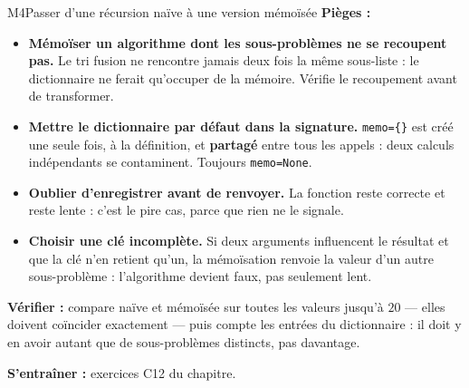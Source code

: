 \begin{fichemethode}{M4}{Passer d'une récursion naïve à une version mémoïsée}
\textbf{Pièges :}
\begin{itemize}
  \item \textbf{Mémoïser un algorithme dont les sous-problèmes ne se recoupent pas.} Le tri
    fusion ne rencontre jamais deux fois la même sous-liste : le dictionnaire ne ferait
    qu'occuper de la mémoire. Vérifie le recoupement avant de transformer.
  \item \textbf{Mettre le dictionnaire par défaut dans la signature.} \lstinline!memo={}! est
    créé une seule fois, à la définition, et \textbf{partagé} entre tous les appels : deux
    calculs indépendants se contaminent. Toujours \lstinline{memo=None}.
  \item \textbf{Oublier d'enregistrer avant de renvoyer.} La fonction reste correcte et reste
    lente : c'est le pire cas, parce que rien ne le signale.
  \item \textbf{Choisir une clé incomplète.} Si deux arguments influencent le résultat et que
    la clé n'en retient qu'un, la mémoïsation renvoie la valeur d'un autre sous-problème :
    l'algorithme devient faux, pas seulement lent.
\end{itemize}

\textbf{Vérifier :} compare naïve et mémoïsée sur toutes les valeurs jusqu'à $20$ — elles
doivent coïncider exactement — puis compte les entrées du dictionnaire : il doit y en avoir
autant que de sous-problèmes distincts, pas davantage.

\textbf{S'entraîner :} exercices C12 du chapitre.
\end{fichemethode}
